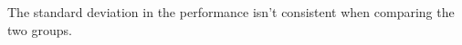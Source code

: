 \documentclass{article}
\begin{document}
\begin{multicols}{2}
The standard deviation in the performance isn't consistent when comparing the two groups.


\end{multicols}
\end{document}

